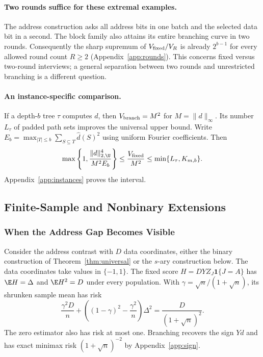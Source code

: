 \paragraph{Two rounds suffice for these extremal examples.}
The address construction asks all address bits in one batch and the selected data bit in a second. The block family also attains its entire branching curve in two rounds. Consequently the sharp supremum of $V_{\rm fixed}/V_R$ is already $2^{b-1}$ for every allowed round count $R\ge2$ (Appendix~\ref{app:rounds}). This concerns fixed versus two-round interviews; a general separation between two rounds and unrestricted branching is a different question.


\paragraph{An instance-specific comparison.}
If a depth-$b$ tree $\tau$ computes $d$, then $V_{\rm branch}=M^2$ for $M=\|d\|_\infty$. Its number $L_\tau$ of padded path sets improves the universal upper bound. Write $E_b=\max_{|T|\le b}\sum_{S\subseteq T}\widehat d(S)^2$ using uniform Fourier coefficients. Then
\[
 \max\left\{1,\frac{\|d\|_{2,\U}^4}{M^2 E_b}\right\}
 \le\frac{V_{\rm fixed}}{M^2}\le\min\{L_\tau,K_{m,b}\}.
\]
Appendix~\ref{app:instances} proves the interval.


\subsection{Finite-Sample and Nonbinary Extensions}\label{app:extensions}
\subsubsection{When the Address Gap Becomes Visible}\label{app:addressfinite}
Consider the address contrast with $D$ data coordinates, either the binary construction of Theorem~\ref{thm:universal} or the $s$-ary construction below. The data coordinates take values in $\{-1,1\}$. The fixed score $H=DYZ_J\mathbf1\{J=A\}$ has $\E H=\Delta$ and $\E H^2=D$ under every population. With $\gamma=\sqrt n/(1+\sqrt n)$, its shrunken sample mean has risk
\[
 \frac{\gamma^2D}{n}+\left((1-\gamma)^2-\frac{\gamma^2}{n}\right)\Delta^2
   =\frac{D}{(1+\sqrt n)^2}.
\]
The zero estimator also has risk at most one. Branching recovers the sign $Yd$ and has exact minimax risk $(1+\sqrt n)^{-2}$ by Appendix~\ref{app:sign}.

